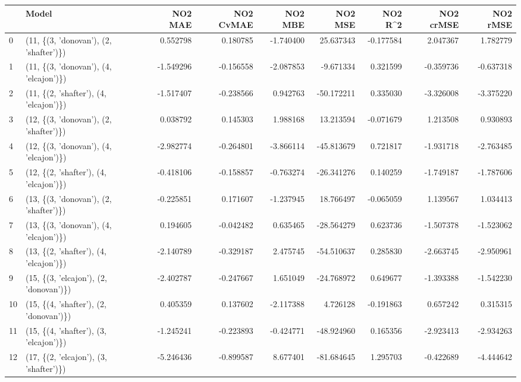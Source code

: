 \begin{tabular}{llrrrrrrr}
\toprule
{} &                                   Model &   NO2 MAE &  NO2 CvMAE &    NO2 MBE &     NO2 MSE &   NO2 R\textasciicircum2 &  NO2 crMSE &  NO2 rMSE \\
\midrule
0  &  (11, \{(3, 'donovan'), (2, 'shafter')\}) &  0.552798 &   0.180785 &  -1.740400 &   25.637343 & -0.177584 &   2.047367 &  1.782779 \\
1  &  (11, \{(3, 'donovan'), (4, 'elcajon')\}) & -1.549296 &  -0.156558 &  -2.087853 &   -9.671334 &  0.321599 &  -0.359736 & -0.637318 \\
2  &  (11, \{(2, 'shafter'), (4, 'elcajon')\}) & -1.517407 &  -0.238566 &   0.942763 &  -50.172211 &  0.335030 &  -3.326008 & -3.375220 \\
3  &  (12, \{(3, 'donovan'), (2, 'shafter')\}) &  0.038792 &   0.145303 &   1.988168 &   13.213594 & -0.071679 &   1.213508 &  0.930893 \\
4  &  (12, \{(3, 'donovan'), (4, 'elcajon')\}) & -2.982774 &  -0.264801 &  -3.866114 &  -45.813679 &  0.721817 &  -1.931718 & -2.763485 \\
5  &  (12, \{(2, 'shafter'), (4, 'elcajon')\}) & -0.418106 &  -0.158857 &  -0.763274 &  -26.341276 &  0.140259 &  -1.749187 & -1.787606 \\
6  &  (13, \{(3, 'donovan'), (2, 'shafter')\}) & -0.225851 &   0.171607 &  -1.237945 &   18.766497 & -0.065059 &   1.139567 &  1.034413 \\
7  &  (13, \{(3, 'donovan'), (4, 'elcajon')\}) &  0.194605 &  -0.042482 &   0.635465 &  -28.564279 &  0.623736 &  -1.507378 & -1.523062 \\
8  &  (13, \{(2, 'shafter'), (4, 'elcajon')\}) & -2.140789 &  -0.329187 &   2.475745 &  -54.510637 &  0.285830 &  -2.663745 & -2.950961 \\
9  &  (15, \{(3, 'elcajon'), (2, 'donovan')\}) & -2.402787 &  -0.247667 &   1.651049 &  -24.768972 &  0.649677 &  -1.393388 & -1.542230 \\
10 &  (15, \{(4, 'shafter'), (2, 'donovan')\}) &  0.405359 &   0.137602 &  -2.117388 &    4.726128 & -0.191863 &   0.657242 &  0.315315 \\
11 &  (15, \{(4, 'shafter'), (3, 'elcajon')\}) & -1.245241 &  -0.223893 &  -0.424771 &  -48.924960 &  0.165356 &  -2.923413 & -2.934263 \\
12 &  (17, \{(2, 'elcajon'), (3, 'shafter')\}) & -5.246436 &  -0.899587 &   8.677401 &  -81.684645 &  1.295703 &  -0.422689 & -4.444642 \\

\end{tabular}

